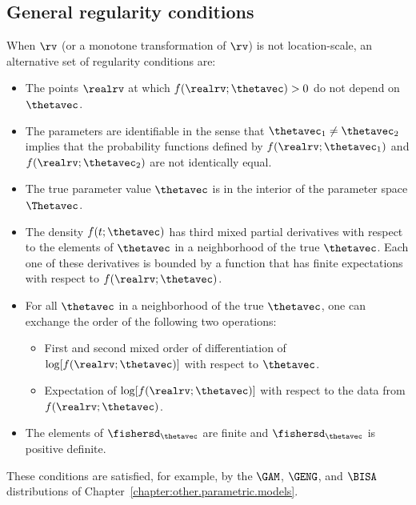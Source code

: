 \subsection{General regularity conditions}
When $\rv$ (or a monotone transformation of
$\rv$) is not location-scale,
an alternative set of regularity conditions are:
\begin{itemize}
\item 
The points $\realrv$ at which $f(\realrv;\thetavec) > 0$ do not
depend on $\thetavec$.
\item 
The parameters are identifiable in the
sense that $\thetavec_{1} \ne \thetavec_{2}$ 
implies that the probability functions defined by
$f(\realrv;\thetavec_{1})$
and 
$f(\realrv;\thetavec_{2})$ are not identically equal.
\item
The true parameter value $\thetavec$ is in the
interior of the parameter space $\Thetavec$. 
\item 
The
density $f(t; \thetavec)$ has third mixed partial
derivatives with respect to the elements of $\thetavec$ in
a neighborhood of the true $\thetavec$. Each one of  these derivatives
is bounded by a function that 
has finite expectations with respect to $f(\realrv; \thetavec)$.
\item 
For all $\thetavec$ in a neighborhood of the true $\thetavec$, one
can exchange the order of the following two operations:
\begin{itemize}
\item
First and second mixed order of differentiation 
of $\log[f(\realrv; \thetavec)]$ 
with respect to $\thetavec$.
\item
Expectation of $\log[f(\realrv; \thetavec)]$ with
respect to the data from $f(\realrv;\thetavec)$.
\end{itemize}
\item 
The elements of $\fishersd_{\thetavec}$ are finite
      and $\fishersd_{\thetavec}$ is positive definite.
\end{itemize}
These conditions are satisfied, for example, by the $\GAM$, $\GENG$, 
and $\BISA$ distributions of Chapter~\ref{chapter:other.parametric.models}.

